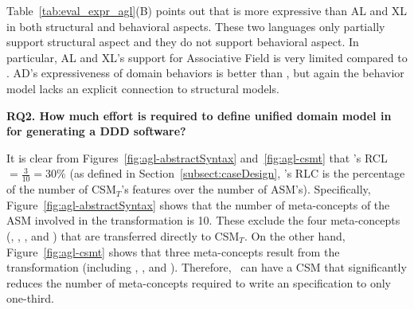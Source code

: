 Table~\ref{tab:eval_expr_agl}(B) points out that \agldcsl is more expressive than AL and XL in both structural and behavioral aspects. These two languages only partially support structural aspect and they do not support behavioral aspect. In particular, AL and XL's support for Associative Field is very limited compared to \agldcsl. AD's expressiveness of domain behaviors is better than \agl, but again the behavior model lacks an explicit connection to structural models.


\noindent \textbf{RQ2. How much effort is required to define unified domain model in \agldcsl for generating a DDD software?}


It is clear from Figures~\ref{fig:agl-abstractSyntax} and~\ref{fig:agl-csmt} that \agl's RCL $ = \frac{3}{10}=30\%$ (as defined in Section~\ref{subsect:caseDesign}, \agl's RLC is the percentage of the number of CSM$_T$'s features over the number of ASM's). Specifically, Figure~\ref{fig:agl-abstractSyntax} shows that the number of meta-concepts of the ASM involved in the transformation is 10. These exclude the four meta-concepts (, , , and ) that are transferred directly to CSM$_T$. On the other hand, Figure~\ref{fig:agl-csmt} shows that three meta-concepts result from the transformation (including , , and ). Therefore, \agl~can have a CSM that significantly reduces the number of meta-concepts required to write an \agl specification to only one-third. 

